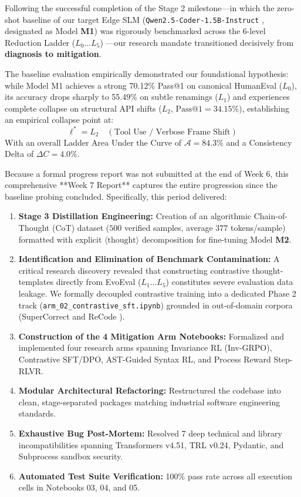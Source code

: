 \documentclass[12pt, a4paper]{article}
\begin{document}
Following the successful completion of the Stage 2 milestone---in which the zero-shot baseline of our target Edge SLM (\texttt{Qwen2.5-Coder-1.5B-Instruct} \cite{qwen25coder}, designated as Model \textbf{M1}) was rigorously benchmarked across the 6-level Reduction Ladder ($L_0 \dots L_5$) \cite{evoeval}---our research mandate transitioned decisively from \textbf{diagnosis to mitigation}.

The baseline evaluation empirically demonstrated our foundational hypothesis: while Model M1 achieves a strong 70.12\% Pass@1 on canonical HumanEval ($L_0$), its accuracy drops sharply to 55.49\% on subtle renamings ($L_1$) and experiences complete collapse on structural API shifts ($L_2$, $\text{Pass@1} = 34.15\%$), establishing an empirical collapse point at:
$$\ell^* = L_2 \quad (\text{Tool Use / Verbose Frame Shift})$$
With an overall Ladder Area Under the Curve of $\mathcal{A} = 84.3\%$ and a Consistency Delta of $\Delta C = 4.0\%$.

Because a formal progress report was not submitted at the end of Week 6, this comprehensive **Week 7 Report** captures the entire progression since the baseline probing concluded. Specifically, this period delivered:
\begin{enumerate}[label=\textbf{\arabic*.}]
  \item \textbf{Stage 3 Distillation Engineering:} Creation of an algorithmic Chain-of-Thought (CoT) dataset ($500$ verified samples, average $377$ tokens/sample) formatted with explicit $\langle\text{thought}\rangle$ decomposition for fine-tuning Model \textbf{M2}.
  \item \textbf{Identification and Elimination of Benchmark Contamination:} A critical research discovery revealed that constructing contrastive thought-templates directly from EvoEval ($L_1 \dots L_5$) constitutes severe evaluation data leakage. We formally decoupled contrastive training into a dedicated Phase 2 track (\texttt{arm\_02\_contrastive\_sft.ipynb}) grounded in out-of-domain corpora (SuperCorrect \cite{supercorrect} and ReCode \cite{recode_contrastive}).
  \item \textbf{Construction of the 4 Mitigation Arm Notebooks:} Formalized and implemented four research arms spanning Invariance RL (Inv-GRPO), Contrastive SFT/DPO, AST-Guided Syntax RL, and Process Reward Step-RLVR.
  \item \textbf{Modular Architectural Refactoring:} Restructured the codebase into clean, stage-separated packages matching industrial software engineering standards.
  \item \textbf{Exhaustive Bug Post-Mortem:} Resolved 7 deep technical and library incompatibilities spanning Transformers v4.51, TRL v0.24, Pydantic, and Subprocess sandbox security.
  \item \textbf{Automated Test Suite Verification:} 100\% pass rate across all execution cells in Notebooks 03, 04, and 05.
\end{enumerate}
\end{document}
